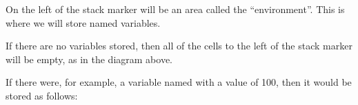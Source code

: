 \begin{center}
\end{center}

On the left of the stack marker will be an area called the ``environment''. This is where we will store named variables.

If there are no variables stored, then all of the cells to the left of the stack marker will be empty, as in the diagram above.

If there were, for example, a variable named  with a value of 100, then it would be stored as follows:

